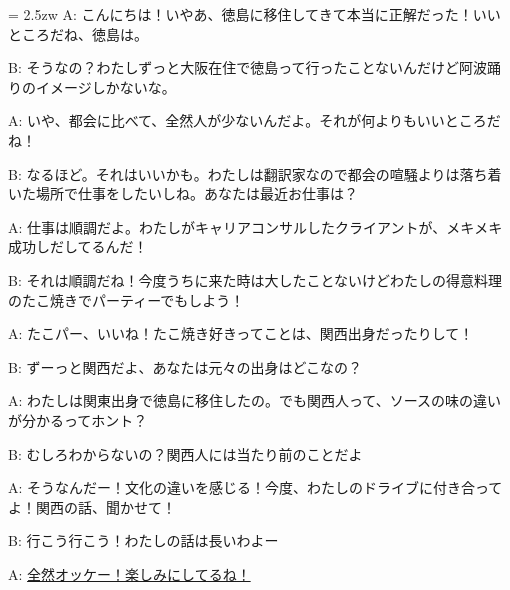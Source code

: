 \documentclass[11pt]{amsart}
\title{}
\author{}
\newenvironment{hangall}[1]{\hangindent = 2.5zw\everypar{\hangindent = 2.5zw}}{}
\begin{document}
\maketitle
\begin{hangall}{}%
A: こんにちは！いやあ、徳島に移住してきて本当に正解だった！いいところだね、徳島は。

B: そうなの？わたしずっと大阪在住で徳島って行ったことないんだけど阿波踊りのイメージしかないな。

A: いや、都会に比べて、全然人が少ないんだよ。それが何よりもいいところだね！

B: なるほど。それはいいかも。わたしは翻訳家なので都会の喧騒よりは落ち着いた場所で仕事をしたいしね。あなたは最近お仕事は？

A: 仕事は順調だよ。わたしがキャリアコンサルしたクライアントが、メキメキ成功しだしてるんだ！

B: それは順調だね！今度うちに来た時は大したことないけどわたしの得意料理のたこ焼きでパーティーでもしよう！

A: たこパー、いいね！たこ焼き好きってことは、関西出身だったりして！

B: ずーっと関西だよ、あなたは元々の出身はどこなの？

A: わたしは関東出身で徳島に移住したの。でも関西人って、ソースの味の違いが分かるってホント？

B: むしろわからないの？関西人には当たり前のことだよ

A: そうなんだー！文化の違いを感じる！今度、わたしのドライブに付き合ってよ！関西の話、聞かせて！

B: 行こう行こう！わたしの話は長いわよー

A: \ul{全然オッケー！楽しみにしてるね！}\end{hangall}
\end{document}
